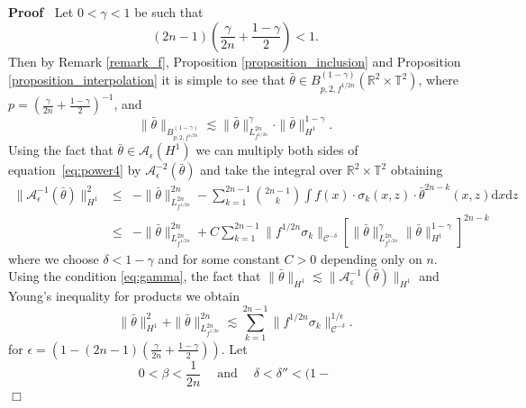 \documentclass[a4paper,10pt]{article}
\newcommand{\mathd}{\mathrm{d}}
\newcommand{\tmop}[1]{\ensuremath{\operatorname{#1}}}
\newenvironment{proof}{\noindent\textbf{Proof\ }}{\hspace*{\fill}$\Box$\medskip}
\begin{document}
\begin{proof}
  Let $0 < \gamma < 1$ be such that
  \begin{equation}
    (2 n - 1) \left( \frac{\gamma}{2 n} + \frac{1 - \gamma}{2} \right) < 1.
    \label{eq:gamma1}
  \end{equation}
  Then by Remark \ref{remark_f}, Proposition \ref{proposition_inclusion} and
  Proposition \ref{proposition_interpolation} it is simple to see that
  $\bar{\theta} \in B^{(1 - \gamma)}_{p, 2, f^{1 / 2 n}} (\mathbb{R}^2 \times
  \mathbb{T}^2)$, where $p = \left( \frac{\gamma}{2 n} + \frac{1 - \gamma}{2}
  \right)^{- 1}$, and
  \[ \| \bar{\theta} \|_{B^{(1 - \gamma)}_{p, 2, f^{1 / 2 n}}} \lesssim \|
     \bar{\theta} \|_{L^{2 n}_{f^{1 / 2 n}}}^{\gamma} \cdot \| \bar{\theta}
     \|^{1 - \gamma}_{H^1} . \]
  Using the fact that $\bar{\theta} \in \mathcal{A}_{\epsilon} (H^1)$ we can
  multiply both sides of equation~{\eqref{eq:power4}} by
  $\mathcal{A}_{\epsilon}^{- 2} (\bar{\theta})$ and take the integral over
  $\mathbb{R}^2 \times \mathbb{T}^2$ obtaining
  \begin{eqnarray}
    \| \mathcal{A}_{\epsilon}^{- 1} (\bar{\theta}) \|_{H^1}^2 & \leqslant & -
    \| \bar{\theta} \|_{L^{2 n}_{f^{1 / 2 n}}}^{2 n} - \sum_{k = 1}^{2 n - 1}
    \binom{2 n - 1}{k} \int f (x) \cdot \sigma_k (x, z) \cdot \bar{\theta}^{2
    n - k} (x, z) \mathd x \mathd z \nonumber\\
    & \leqslant & - \| \bar{\theta} \|_{L^{2 n}_{f^{1 / 2 n}}}^{2 n} + C
    \sum_{k = 1}^{2 n - 1} \| f^{1 / 2 n} \sigma_k \|_{\mathcal{C}^{- \delta}}
    \left[ \| \bar{\theta} \|_{L^{2 n}_{f^{1 / 2 n}}}^{\gamma} \| \bar{\theta}
    \|^{1 - \gamma}_{H^1} \right]^{2 n - k} \nonumber
  \end{eqnarray}
  where we choose $\delta < 1 - \gamma$ and for some constant $C > 0$
  depending only on $n$. Using the condition {\eqref{eq:gamma}}, the fact that
  $\| \bar{\theta} \|_{H^1} \lesssim \| \mathcal{A}^{- 1}_{\varepsilon}
  (\bar{\theta}) \|_{H^1}$ and Young's inequality for products we obtain
  \begin{equation}
    \| \mathcal{} \bar{\theta} \|_{H^1}^2 + \| \bar{\theta} \|_{L^{2 n}_{f^{1
    / 2 n}}}^{2 n} \lesssim \sum_{k = 1}^{2 n - 1} \| f^{1 / 2 n} \sigma_k
    \|_{\mathcal{C}^{- \delta}}^{1 / \epsilon} . \label{eq:p1}
  \end{equation}
  for $\epsilon = \left( 1 - (2 n - 1) \left( \frac{\gamma}{2 n} + \frac{1 -
  \gamma}{2} \right) \right)$. Let
  \begin{equation}
    0 < \beta < \frac{1}{2 n} \quad \tmop{and} \quad \delta < \delta'' < (1 -

\end{equation}
\end{proof}
\end{document}
